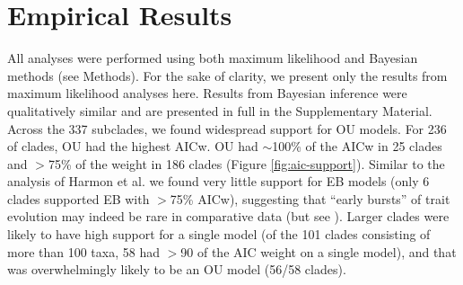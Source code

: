 \documentclass[a4paper,12pt]{article}
\begin{document}
\section{Empirical Results}

All analyses were performed using both maximum likelihood and Bayesian methods (see Methods). For the sake of clarity, we present only the results from maximum likelihood analyses here. Results from Bayesian inference were qualitatively similar and are presented in full in the Supplementary Material. Across the 337 subclades, we found widespread support for OU
models. For 236 of clades, OU had the highest AICw.
OU had $\sim$100\% of the AICw in 25 clades and $>$75\% of the weight in 186 clades (Figure \ref{fig:aic-support}). Similar to the analysis of Harmon et al. \citep{Harmon2010} we found very little support for EB models (only 6 clades supported EB with $>$75\% AICw), suggesting that ``early bursts'' of trait evolution may indeed be rare in comparative data (but see \citep{SlaterPennell}). Larger clades were
likely to have high support for a single model (of the 101 clades consisting of more than 100 taxa, 58 had $>$90 of the AIC weight on a single model),
and that was overwhelmingly likely to be an OU model (56/58 clades). 
\end{document}
